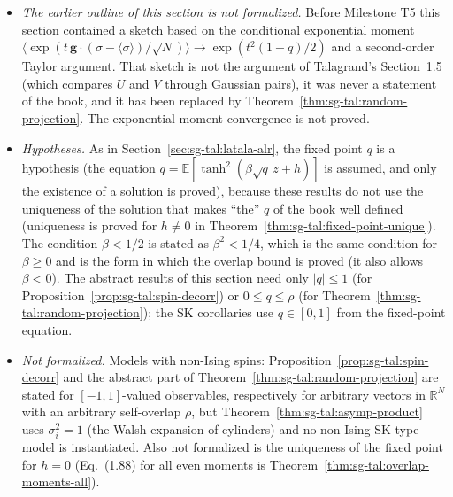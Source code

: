 \begin{remark}
\begin{itemize}
\item \emph{The earlier outline of this section is not formalized.} Before Milestone T5 this section contained a sketch based on the conditional exponential moment $\langle\exp(t\,\mathbf g\cdot(\sigma-\langle\sigma\rangle)/\sqrt N)\rangle\to\exp(t^2(1-q)/2)$ and a second-order Taylor argument. That sketch is not the argument of Talagrand's Section~1.5 (which compares $U$ and $V$ through Gaussian pairs), it was never a statement of the book, and it has been replaced by Theorem~\ref{thm:sg-tal:random-projection}. The exponential-moment convergence is not proved.

\item \emph{Hypotheses.} As in Section~\ref{sec:sg-tal:latala-alr}, the fixed point $q$ is a hypothesis (the equation $q=\mathbb{E}[\tanh^2(\beta\sqrt q\,z+h)]$ is assumed, and only the existence of a solution is proved), because these results do not use the uniqueness of the solution that makes ``the'' $q$ of the book well defined (uniqueness is proved for $h\ne0$ in Theorem~\ref{thm:sg-tal:fixed-point-unique}). The condition $\beta<1/2$ is stated as $\beta^2<1/4$, which is the same condition for $\beta\ge0$ and is the form in which the overlap bound is proved (it also allows $\beta<0$). The abstract results of this section need only $|q|\le1$ (for Proposition~\ref{prop:sg-tal:spin-decorr}) or $0\le q\le\rho$ (for Theorem~\ref{thm:sg-tal:random-projection}); the SK corollaries use $q\in[0,1]$ from the fixed-point equation.

\item \emph{Not formalized.} Models with non-Ising spins: Proposition~\ref{prop:sg-tal:spin-decorr} and the abstract part of Theorem~\ref{thm:sg-tal:random-projection} are stated for $[-1,1]$-valued observables, respectively for arbitrary vectors in $\mathbb{R}^N$ with an arbitrary self-overlap $\rho$, but Theorem~\ref{thm:sg-tal:asymp-product} uses $\sigma_i^2=1$ (the Walsh expansion of cylinders) and no non-Ising SK-type model is instantiated. Also not formalized is the uniqueness of the fixed point for $h=0$ (Eq.~(1.88) for all even moments is Theorem~\ref{thm:sg-tal:overlap-moments-all}).
\end{itemize}
\end{remark}

